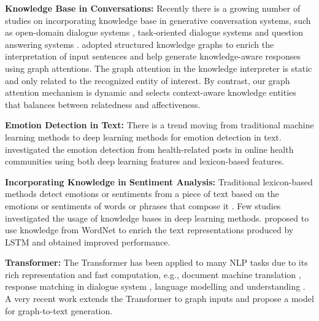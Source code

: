 \documentclass[11pt,a4paper]{article}
\begin{document}
\noindent\textbf{Knowledge Base in Conversations:} Recently there is a growing number of studies on incorporating knowledge base in generative conversation systems, such as open-domain dialogue systems \cite{han2015exploiting, asghar2018affective, ghazvininejad2018knowledge, young2018augmenting, parthasarathi2018extending, liu2018knowledge, moghe2018towards, dinan2018wizard, zhong2019affect}, task-oriented dialogue systems \cite{madotto2018mem2seq, wu2018globaltolocal, he2019hierarchical} and question answering systems \cite{kiddon2016globally, hao2017end, sun2018open, mihaylov2018knowledgeable}. 
\citet{zhou2018commonsense} adopted structured knowledge graphs to enrich the interpretation of input sentences and help generate knowledge-aware responses using graph attentions. The graph attention in the knowledge interpreter \cite{zhou2018commonsense} is static and only related to the recognized entity of interest. By contrast, our graph attention mechanism is dynamic and selects context-aware knowledge entities that balances between relatedness and affectiveness.


\noindent\textbf{Emotion Detection in Text:} There is a trend moving from traditional machine learning methods \cite{pang2002thumbs, wang2012baselines, seyeditabari2018emotion} to deep learning methods \cite{abdul2017emonet, zhang2018text} for emotion detection in text. \citet{khanpour2018fine} investigated the emotion detection from health-related posts in online health communities using both deep learning features and lexicon-based features. 

\noindent\textbf{Incorporating Knowledge in Sentiment Analysis:} Traditional lexicon-based methods detect emotions or sentiments from a piece of text based on the emotions or sentiments of words or phrases that compose it \cite{hu2009lyric, taboada2011lexicon, bandhakavi2017lexicon}. 
Few studies investigated the usage of knowledge bases in deep learning methods. \citet{kumar2018knowledge} proposed to use knowledge from WordNet \cite{fellbaum2012wordnet} to enrich the text representations produced by LSTM and obtained improved performance.

\noindent\textbf{Transformer:} The Transformer has been applied to many NLP tasks due to its rich representation and fast computation, e.g., document machine translation \cite{zhang2018improving}, response matching in dialogue system \cite{zhou2018multi}, language modelling \cite{dai2019transformer} and understanding \cite{radford2018improving}. A very recent work \cite{koncel2019text} extends the Transformer to graph inputs and propose a model for graph-to-text generation. 
\end{document}
